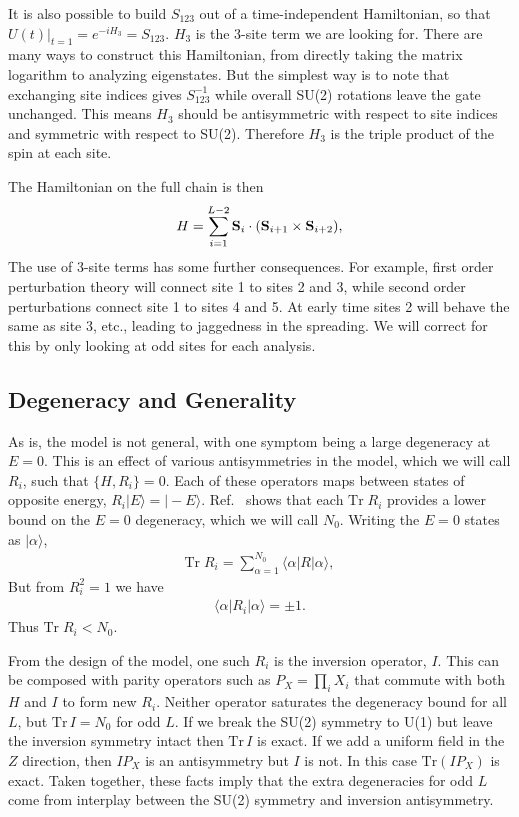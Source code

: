 \documentclass[aps,prx,reprint,superscriptaddress, longbibliography]{revtex4-1}
\newcommand{\Tr}{ \mbox{Tr}}
\begin{document}
It is also possible to build $S_{123}$ out of a time-independent Hamiltonian, so that $U(t)|_{t=1} = e^{-iH_3} = S_{123}$. $H_3$ is the 3-site term we are looking for. There are many ways to construct this Hamiltonian, from directly taking the matrix logarithm to analyzing eigenstates. But the simplest way is to note that exchanging site indices gives $S_{123}^{-1}$ while overall SU(2) rotations leave the gate unchanged. This means $H_3$ should be antisymmetric with respect to site indices and symmetric with respect to SU(2). Therefore $H_3$ is the triple product of the spin at each site.

The Hamiltonian on the full chain is then
\begin{align}
H = \sum_{i=1}^{L-2}{\bf S}_i\cdot({\bf S}_{i+1}\times {\bf S}_{i+2}),\nonumber
\end{align}
The use of 3-site terms has some further consequences. For example, first order perturbation theory will connect site 1 to sites 2 and 3, while second order perturbations connect site 1 to sites 4 and 5. At early time sites 2 will behave the same as site 3, etc., leading to jaggedness in the spreading.
We will correct for this by only looking at odd sites for each analysis. 

\subsection{Degeneracy and Generality}

As is, the model is not general, with one symptom being a large degeneracy at $E=0$. This is an effect of various antisymmetries in the model, which we will call $R_i$, such that $\{H, R_i\}=0$. Each of these operators maps between states of opposite energy, $R_i|E\rangle = |-E\rangle$. Ref.~\cite{IadecolaFSUSY} shows that each $\Tr\;R_i$ provides a lower bound on the $E=0$ degeneracy, which we will call $N_0$. Writing the $E=0$ states as $|\alpha\rangle$,
\begin{align}
\Tr\;R_i = \sum_{\alpha=1}^{N_0}\langle\alpha|R|\alpha\rangle,
\end{align}
But from $R_i^2=1$ we have
\begin{align}
\langle\alpha|R_i|\alpha\rangle=\pm 1.
\end{align}
Thus $\Tr\; R_i < N_0$.

From the design of the model, one such $R_i$ is the inversion operator, $I$. This can be composed with parity operators such as $P_X=\prod_i X_i$ that commute with both $H$ and $I$ to form new $R_i$. Neither operator saturates the degeneracy bound for all $L$, but $\Tr\,I=N_0$ for odd $L$. If we break the SU(2) symmetry to U(1) but leave the inversion symmetry intact then $\Tr\,I$ is exact. If we add a uniform field in the $Z$ direction, then $IP_X$ is an antisymmetry but $I$ is not. In this case $\Tr(IP_X)$ is exact. Taken together, these facts imply that the extra degeneracies for odd $L$ come from interplay between the SU(2) symmetry and inversion antisymmetry.
\end{document}

